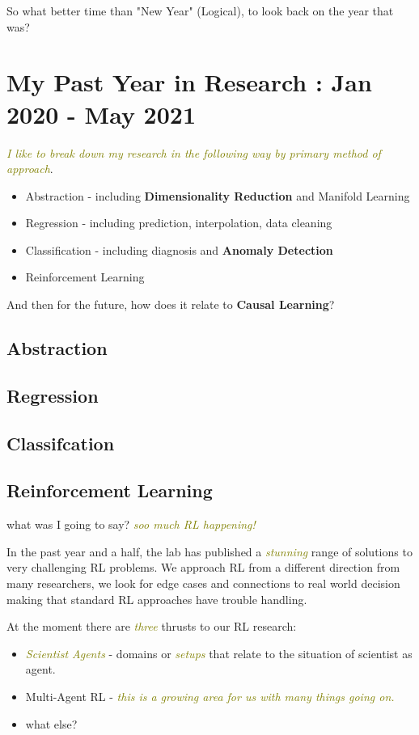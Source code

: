\documentclass{article}
\newcommand*{\bla}[1]{\textit{\textcolor{olive}{#1}}}
\begin{document}
So what better time than "New Year" (Logical), to look back on the year that was?

\section{My Past Year in Research : Jan 2020 - May 2021}
\bla{I like to break down my research in the following way by primary method of approach}.
\begin{itemize}
    \item Abstraction - including \textbf{Dimensionality Reduction} and Manifold Learning
    \item Regression - including prediction, interpolation, data cleaning
    \item Classification - including diagnosis and \textbf{Anomaly Detection}
    \item Reinforcement Learning
\end{itemize}

And then for the future, how does it relate to \textbf{Causal Learning}?

\subsection{Abstraction}
\subsection{Regression}
\subsection{Classifcation}
\subsection{Reinforcement Learning}
what was I going to say? \bla{soo much RL happening!}

In the past year and a half, the lab has published a \bla{stunning} range of solutions to very challenging RL problems. 
We approach RL from a different direction from many researchers, we look for edge cases and connections to real world decision making that standard RL approaches have trouble handling.

At the moment there are \bla{three} thrusts to our RL research:
\begin{itemize}
    \item \bla{Scientist Agents} - domains or \bla{setups} that relate to the situation of scientist as agent. 
    \item Multi-Agent RL - \bla{this is a growing area for us with many things going on.}
    \item what else?
\end{itemize}
\end{document}
